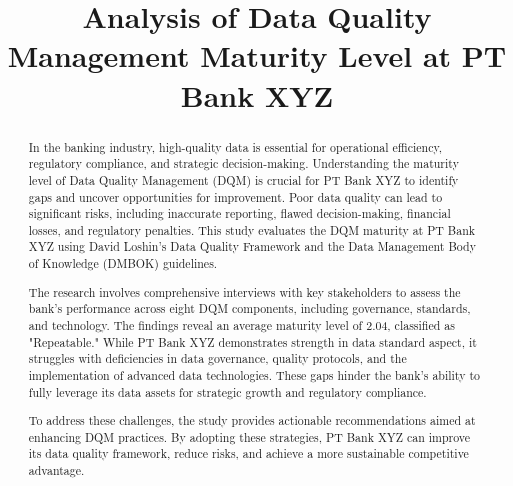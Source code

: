 \documentclass[conference]{IEEEtran}
\begin{document}
\title{Analysis of Data Quality Management Maturity Level at PT Bank XYZ\\
}

\author{

\and
{}

\and
{}
}

\maketitle

\begin{abstract}
In the banking industry, high-quality data is essential for operational efficiency, regulatory compliance, and strategic decision-making. Understanding the maturity level of Data Quality Management (DQM) is crucial for PT Bank XYZ to identify gaps and uncover opportunities for improvement. Poor data quality can lead to significant risks, including inaccurate reporting, flawed decision-making, financial losses, and regulatory penalties. This study evaluates the DQM maturity at PT Bank XYZ using David Loshin’s Data Quality Framework and the Data Management Body of Knowledge (DMBOK) guidelines.

The research involves comprehensive interviews with key stakeholders to assess the bank's performance across eight DQM components, including governance, standards, and technology. The findings reveal an average maturity level of 2.04, classified as "Repeatable." While PT Bank XYZ demonstrates strength in data standard aspect, it struggles with deficiencies in data governance, quality protocols, and the implementation of advanced data technologies. These gaps hinder the bank’s ability to fully leverage its data assets for strategic growth and regulatory compliance.

To address these challenges, the study provides actionable recommendations aimed at enhancing DQM practices. By adopting these strategies, PT Bank XYZ can improve its data quality framework, reduce risks, and achieve a more sustainable competitive advantage.
\end{abstract}
\end{document}
